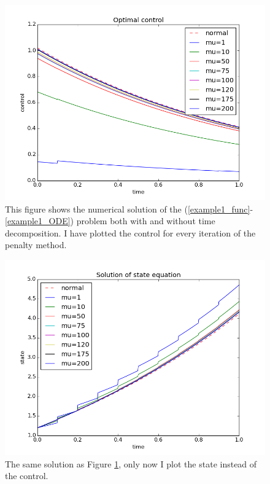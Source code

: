 \documentclass[11pt,a4paper]{article}
\begin{document}
\begin{figure}
  \includegraphics[width=\linewidth]{test1_PC_control.png}
  \caption{This figure shows the numerical solution of the (\ref{example1_func}-\ref{example1_ODE}) problem both with and without time decomposition. I have plotted the control for every iteration of the penalty method.} 
  \label{Fig 1}
\end{figure}
\begin{figure}
  \includegraphics[width=\linewidth]{test1_PC_state.png}
  \caption{The same solution as Figure \ref{Fig 1}, only now I plot the state instead of the control.}
  \label{Fig 2}
\end{figure}
\end{document}
